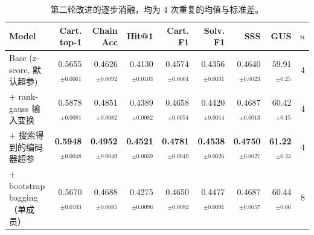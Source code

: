 \begin{table}[t]
\centering
\small
\caption{第二轮改进的逐步消融，均为 4 次重复的均值与标准差。}
\label{tab:improve}
\begin{tabular}{lrrrrrrrr}
\toprule
Model & Cart. top-1 & Chain Acc & Hit@1 & Cart. F1 & Solv. F1 & SSS & GUS & $n$ \\
\midrule
Base (z-score, 默认超参) & 0.5655$_{\pm 0.0061}$ & 0.4626$_{\pm 0.0092}$ & 0.4130$_{\pm 0.0103}$ & 0.4574$_{\pm 0.0064}$ & 0.4356$_{\pm 0.0031}$ & 0.4640$_{\pm 0.0023}$ & 59.91$_{\pm 0.25}$ & 4 \\
+ rank-gauss 输入变换 & 0.5878$_{\pm 0.0081}$ & 0.4851$_{\pm 0.0082}$ & 0.4389$_{\pm 0.0082}$ & 0.4658$_{\pm 0.0054}$ & 0.4420$_{\pm 0.0014}$ & 0.4687$_{\pm 0.0013}$ & 60.42$_{\pm 0.15}$ & 4 \\
+ 搜索得到的编码器超参 & \textbf{0.5948$_{\pm 0.0048}$} & \textbf{0.4952$_{\pm 0.0049}$} & \textbf{0.4521$_{\pm 0.0039}$} & \textbf{0.4781$_{\pm 0.0049}$} & \textbf{0.4538$_{\pm 0.0026}$} & \textbf{0.4750$_{\pm 0.0027}$} & \textbf{61.22$_{\pm 0.23}$} & 4 \\
+ bootstrap bagging（单成员） & 0.5670$_{\pm 0.0103}$ & 0.4688$_{\pm 0.0085}$ & 0.4275$_{\pm 0.0096}$ & 0.4650$_{\pm 0.0082}$ & 0.4477$_{\pm 0.0091}$ & 0.4687$_{\pm 0.0057}$ & 60.44$_{\pm 0.66}$ & 8 \\
\bottomrule
\end{tabular}
\vspace{2pt}{\footnotesize 每行在上一行基础上叠加一处改动。bagging 单成员因只见到约 63\% 的训练样本而低于前一行，其价值体现在集成之后（见表 2）。}
\end{table}
